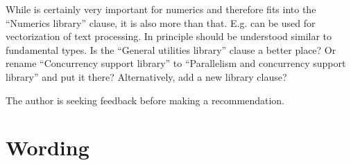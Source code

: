 While  is certainly very important for numerics and therefore fits into the “Numerics library” clause, it is also more than that.
E.g.  can be used for vectorization of text processing.
In principle  should be understood similar to fundamental types.
Is the “General utilities library” clause a better place?
Or rename “Concurrency support library” to “Parallelism and concurrency support library” and put it there?
Alternatively, add a new library clause?

The author is seeking feedback before making a recommendation.

\section{Wording}





